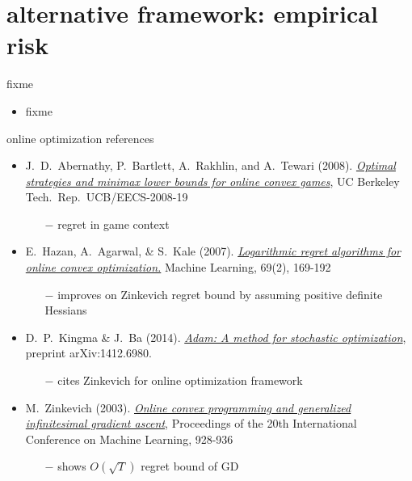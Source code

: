 \documentclass[xcolor={svgnames},
               hyperref={colorlinks,citecolor=DeepPink4,linkcolor=FireBrick,urlcolor=Maroon}]
               {beamer}
\begin{document}
\section{alternative framework: empirical risk}

\begin{frame}{fixme}

\begin{itemize}
\item fixme
\end{itemize}
\end{frame}


\begin{frame}{online optimization references}

\begin{itemize}
\footnotesize
\item J.~D.~Abernathy, P.~Bartlett, A.~Rakhlin, and A.~Tewari (2008). \href{https://www2.eecs.berkeley.edu/Pubs/TechRpts/2008/EECS-2008-19.pdf}{\emph{Optimal strategies and minimax lower bounds for online convex games}}, UC Berkeley Tech.~Rep.~UCB/EECS-2008-19
    \begin{itemize}
    \scriptsize
    \item[$-$] regret in game context
    \end{itemize}
\item E.~Hazan, A.~Agarwal, \& S.~Kale (2007).  \href{https://link.springer.com/content/pdf/10.1007/s10994-007-5016-8.pdf}{\emph{Logarithmic regret algorithms for online convex optimization.}} Machine Learning, 69(2), 169-192
    \begin{itemize}
    \scriptsize
    \item[$-$] improves on Zinkevich regret bound by assuming positive definite Hessians
    \end{itemize}
\item D.~P.~Kingma \& J.~Ba (2014). \href{https://arxiv.org/abs/1412.6980}{\emph{Adam: A method for stochastic optimization}}, preprint arXiv:1412.6980.
    \begin{itemize}
    \scriptsize
    \item[$-$] cites Zinkevich for online optimization framework
    \end{itemize}
\item M.~Zinkevich (2003). \href{https://www.aaai.org/Papers/ICML/2003/ICML03-120.pdf}{\emph{Online convex programming and generalized infinitesimal gradient ascent}}, Proceedings of the 20th International Conference on Machine Learning, 928-936
    \begin{itemize}
    \scriptsize
    \item[$-$] shows $O(\sqrt{T})$ regret bound of GD
    \end{itemize}
\end{itemize}
\end{frame}
\end{document}
